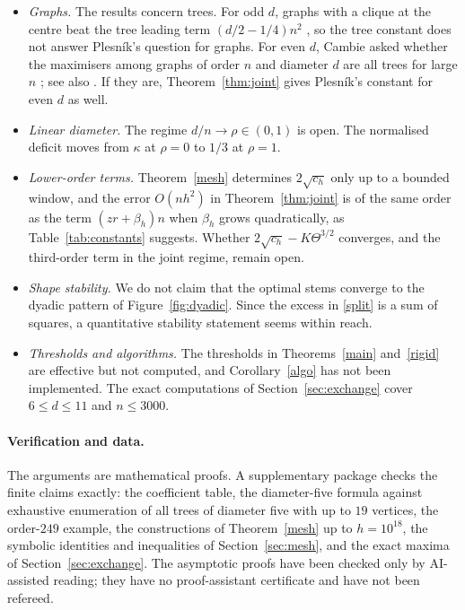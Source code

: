 \documentclass[11pt,a4paper]{article}
\theoremstyle{remark}
\begin{document}
\begin{itemize}
\item \emph{Graphs.} The results concern trees. For odd $d$, graphs with a clique at the centre beat the tree leading term $(d/2-1/4)n^2$ \cite{cambie}, so the tree constant does not answer Plesník's question for graphs. For even $d$, Cambie asked whether the maximisers among graphs of order $n$ and diameter $d$ are all trees for large $n$ \cite{cambie}; see also \cite[Question~35]{kst}. If they are, Theorem~\ref{thm:joint} gives Plesník's constant for even $d$ as well.
\item \emph{Linear diameter.} The regime $d/n\to\rho\in(0,1)$ is open. The normalised deficit moves from $\kappa$ at $\rho=0$ to $1/3$ at $\rho=1$.
\item \emph{Lower-order terms.} Theorem~\ref{mesh} determines $2\sqrt{c_h}$ only up to a bounded window, and the error $O(nh^2)$ in Theorem~\ref{thm:joint} is of the same order as the term $(zr+\beta_h)n$ when $\beta_h$ grows quadratically, as Table~\ref{tab:constants} suggests. Whether $2\sqrt{c_h}-K\Theta^{3/2}$ converges, and the third-order term in the joint regime, remain open.
\item \emph{Shape stability.} We do not claim that the optimal stems converge to the dyadic pattern of Figure~\ref{fig:dyadic}. Since the excess in \eqref{split} is a sum of squares, a quantitative stability statement seems within reach.
\item \emph{Thresholds and algorithms.} The thresholds in Theorems~\ref{main} and~\ref{rigid} are effective but not computed, and Corollary~\ref{algo} has not been implemented. The exact computations of Section~\ref{sec:exchange} cover $6\le d\le11$ and $n\le3000$.
\end{itemize}

\paragraph{Verification and data.} The arguments are mathematical proofs. A supplementary package checks the finite claims exactly: the coefficient table, the diameter-five formula against exhaustive enumeration of all trees of diameter five with up to $19$ vertices, the order-$249$ example, the constructions of Theorem~\ref{mesh} up to $h=10^{18}$, the symbolic identities and inequalities of Section~\ref{sec:mesh}, and the exact maxima of Section~\ref{sec:exchange}. The asymptotic proofs have been checked only by AI-assisted reading; they have no proof-assistant certificate and have not been refereed.
\end{document}
